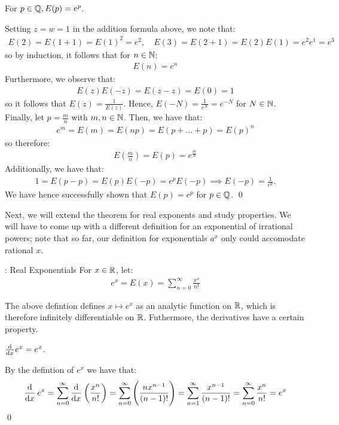 \begin{ntheorem}{}{}
    For $p \in \mathbb{Q}, E(p) = e^p$. 
\end{ntheorem}
\begin{nproof}
    Setting $z = w = 1$ in the addition formula above, we note that:
    \begin{align*}
        E(2) = E(1 + 1) = E(1)^2 = e^2, \quad E(3) = E(2 + 1) = E(2)E(1) = e^2e^1 = e^3
    \end{align*}
    so by induction, it follows that for $n \in \mathbb{N}$:
    \begin{align*}
        E(n) = e^n
    \end{align*}
    Furthermore, we observe that:
    \begin{align*}
        E(z)E(-z) = E(z - z) = E(0) = 1
    \end{align*}
    so it follows that $E(z) = \frac{1}{E(z)}$. Hence, $E(-N) = \frac{1}{e^N} = e^{-N}$ for $N \in \mathbb{N}$. Finally, let $p = \frac{m}{n}$ with $m, n \in \mathbb{N}$. Then, we have that:
    \begin{align*}
        e^m = E(m) = E(np) = E(p + \ldots + p) = E(p)^n
    \end{align*}
    so therefore:
    \begin{align*}
        E(\frac{m}{n}) = E(p) = e^{\frac{m}{n}}
    \end{align*}
    Additionally, we have that:
    \begin{align*}
        1 = E(p - p) = E(p)E(-p) = e^pE(-p) \implies E(-p) = \frac{1}{e^p}.
    \end{align*}
    We have hence successfully shown that $E(p) = e^p$ for $p \in \mathbb{Q}$. \qed
\end{nproof}
\noindent Next, we will extend the theorem for real exponents and study properties. We will have to come up with a different definition for an exponential of irrational powers; note that so far, our definition for exponentials $a^x$ only could accomodate rational $x$. 

\begin{ndef}{: Real Exponentials}{}
    For $x \in \mathbb{R}$, let:
    \begin{align*}
        e^x = E(x) = \sum_{n=0}^\infty \frac{x^n}{n!}
    \end{align*}
\end{ndef}
\noindent The above defintion defines $x \mapsto e^x$ as an analytic function on $\mathbb{R}$, which is therefore infinitely differentiable on $\mathbb{R}$. Futhermore, the derivatives have a certain property.
\begin{ntheorem}{}{}
    $\od{}{x}e^x = e^x$.
\end{ntheorem}
\begin{nproof}
    By the defintion of $e^x$ we have that:
    \begin{align*}
        \dod{}{x}e^x = \sum_{n=0}^\infty \dod{}{x}\left(\frac{x^n}{n!}\right) = \sum_{n=0}^\infty \left(\frac{nx^{n-1}}{(n-1)!}\right) = \sum_{n=1}^\infty \frac{x^{n-1}}{(n-1)!} = \sum_{n=0}^\infty \frac{x^n}{n!} = e^x
    \end{align*} \qed
\end{nproof}

